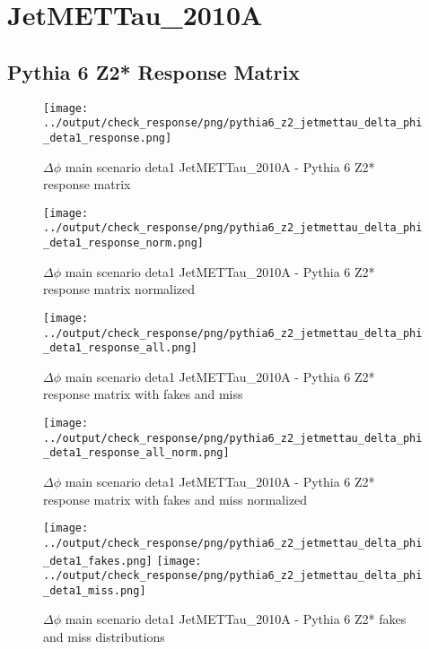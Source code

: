 \documentclass[11pt]{book}
\begin{document}
\section{JetMETTau\_2010A}
\subsection{Pythia 6 Z2* Response Matrix}

\begin{figure}[ht]
\centering
\texttt{[image: ../output/check\_response/png/pythia6\_z2\_jetmettau\_delta\_phi\_deta1\_response.png]}
\caption{$\Delta\phi$ main scenario deta1 JetMETTau\_2010A - Pythia 6 Z2* response matrix}
\label{p6_jetmettau_delta_phi_deta1_response}
\end{figure}

\begin{figure}[ht]
\centering
\texttt{[image: ../output/check\_response/png/pythia6\_z2\_jetmettau\_delta\_phi\_deta1\_response\_norm.png]}
\caption{$\Delta\phi$ main scenario deta1 JetMETTau\_2010A - Pythia 6 Z2* response matrix normalized}
\label{p6_jetmettau_delta_phi_deta1_response_norm}
\end{figure}

\begin{figure}[ht]
\centering
\texttt{[image: ../output/check\_response/png/pythia6\_z2\_jetmettau\_delta\_phi\_deta1\_response\_all.png]}
\caption{$\Delta\phi$ main scenario deta1 JetMETTau\_2010A - Pythia 6 Z2* response matrix with fakes and miss}
\label{p6_jetmettau_delta_phi_deta1_response_all}
\end{figure}

\begin{figure}[ht]
\centering
\texttt{[image: ../output/check\_response/png/pythia6\_z2\_jetmettau\_delta\_phi\_deta1\_response\_all\_norm.png]}
\caption{$\Delta\phi$ main scenario deta1 JetMETTau\_2010A - Pythia 6 Z2* response matrix with fakes and miss normalized}
\label{p6_jetmettau_delta_phi_deta1_response_all_norm}
\end{figure}

\begin{figure}[ht]
\centering
\texttt{[image: ../output/check\_response/png/pythia6\_z2\_jetmettau\_delta\_phi\_deta1\_fakes.png]}
\texttt{[image: ../output/check\_response/png/pythia6\_z2\_jetmettau\_delta\_phi\_deta1\_miss.png]}
\caption{$\Delta\phi$ main scenario deta1 JetMETTau\_2010A - Pythia 6 Z2* fakes and miss distributions}
\label{p6_jetmettau_delta_phi_deta1_fakesmiss}
\end{figure}
\end{document}
